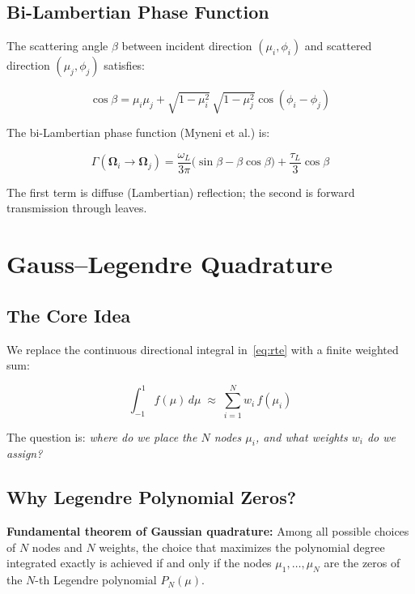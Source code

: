 \documentclass[12pt]{article}
\begin{document}
\subsection{Bi-Lambertian Phase Function}

The scattering angle $\beta$ between incident direction $(\mu_i, \phi_i)$ and
scattered direction $(\mu_j, \phi_j)$ satisfies:

\begin{equation}
  \cos\beta = \mu_i\mu_j
  + \sqrt{1-\mu_i^2}\,\sqrt{1-\mu_j^2}\cos(\phi_i - \phi_j)
\end{equation}

The bi-Lambertian phase function (Myneni et al.) is:

\begin{equation}
  \Gamma(\boldsymbol{\Omega}_i \to \boldsymbol{\Omega}_j)
  = \frac{\omega_L}{3\pi}\bigl(\sin\beta - \beta\cos\beta\bigr)
    + \frac{\tau_L}{3}\cos\beta
\end{equation}

The first term is diffuse (Lambertian) reflection; the second is forward
transmission through leaves.

\section{Gauss--Legendre Quadrature}

\subsection{The Core Idea}

We replace the continuous directional integral in~\eqref{eq:rte} with a
finite weighted sum:

\begin{equation}
  \int_{-1}^{1} f(\mu)\,d\mu \;\approx\; \sum_{i=1}^{N} w_i\,f(\mu_i)
\end{equation}

The question is: \emph{where do we place the $N$ nodes $\mu_i$, and what
weights $w_i$ do we assign?}

\subsection{Why Legendre Polynomial Zeros?}

\textbf{Fundamental theorem of Gaussian quadrature:} Among all possible
choices of $N$ nodes and $N$ weights, the choice that maximizes the
polynomial degree integrated exactly is achieved if and only if the nodes
$\mu_1, \ldots, \mu_N$ are the zeros of the $N$-th Legendre polynomial
$P_N(\mu)$.
\end{document}

